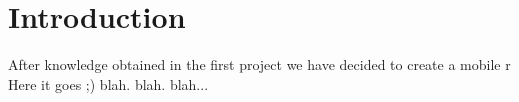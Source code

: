 \section{Introduction}
After knowledge obtained in the first project we have decided to create a mobile r
Here it goes ;)
blah. blah. blah...